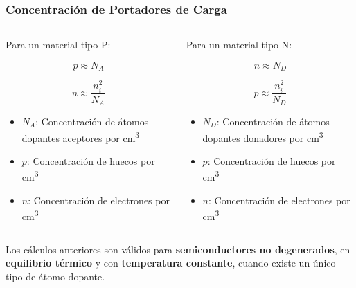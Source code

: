 \documentclass[10pt,t,aspectratio=169]{beamer}
\begin{document}
\begin{frame}[t]
  \frametitle{Concentración de Portadores de Carga}

  \begin{columns}
    \begin{column}{0.5\textwidth}
      Para un material tipo P:

      \[ p \approx N_A \]

      \[ n \approx \dfrac{n_i^2}{N_A} \]

      \begin{itemize}
        \item $N_A$: Concentración de átomos dopantes aceptores por cm\textsuperscript{3}
        \item $p$: Concentración de huecos por cm\textsuperscript{3}
        \item $n$: Concentración de electrones por cm\textsuperscript{3}
      \end{itemize}
    \end{column}
    \begin{column}{0.5\textwidth}
      Para un material tipo N:

      \[ n \approx N_D \]
    
      \[ p \approx \dfrac{n_i^2}{N_D} \]

      \begin{itemize}
        \item $N_D$: Concentración de átomos dopantes donadores por cm\textsuperscript{3}
        \item $p$: Concentración de huecos por cm\textsuperscript{3}
        \item $n$: Concentración de electrones por cm\textsuperscript{3}
      \end{itemize}
    \end{column}
  \end{columns}

  \vspace{5mm}
  Los cálculos anteriores son válidos para \textbf{semiconductores no degenerados}, en \textbf{equilibrio térmico} y con \textbf{temperatura constante}, cuando existe un único tipo de átomo dopante.
\end{frame}
\end{document}
